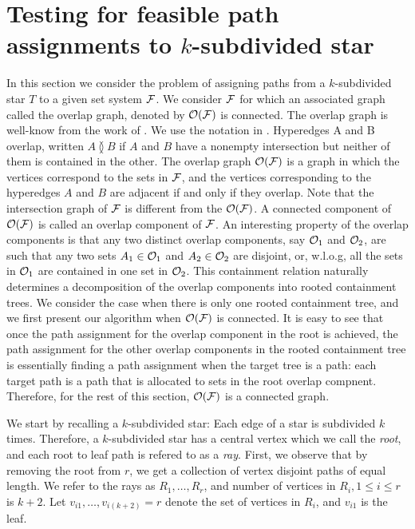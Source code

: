 \documentclass[11pt,letter]{../lib/llncs}
\def\cF{{\cal F}}
\def\cO{{\cal O}}
\def\overlap{\between}
\begin{document}
\section{Testing for feasible path assignments to $k$-subdivided star}
\label{sec:ksubdivstar}
In this section we consider the problem of assigning paths from a $k$-subdivided 
star $T$ to a given set system $\cF$.  We consider $\cF$ for which an associated graph
called the overlap graph, denoted by $\cO(\cF)$ is connected.  The overlap graph is well-know from the work of \cite{kklv10,nsnrs09,wlh02}.   We use the notation in \cite{kklv10}.  Hyperedges A and B overlap, written $A \overlap B$  if $A$ and
$B$ have a nonempty intersection but neither of them is contained in  the other. The
overlap graph $\cO(\cF)$ is a graph in which the vertices correspond to the sets in $\cF$,
and the
vertices corresponding to the hyperedges $A$ and $B$ are adjacent if and only if
they overlap.  Note that the intersection graph of $\cF$ is different from the $\cO(\cF)$.
 A connected component of $\cO(\cF)$ is called an overlap component of $\cF$.  
An interesting property of the overlap components is that any two distinct overlap 
components, say $\cO_1$ and $\cO_2$, are such that any two sets $A_1 \in \cO_1$ and $A_2 \in \cO_2$ are disjoint, or, w.l.o.g, all the sets in $\cO_1$ are contained in one set in $\cO_2$.  
 This containment relation naturally determines a decomposition of the overlap 
components into rooted containment trees.   We consider the case when there is only one rooted containment tree, and we first present our algorithm when $\cO(\cF)$ is
connected.  It is easy to see that once the path assignment for the overlap component in the root is achieved, the path assignment for the other overlap components in the rooted containment tree is
essentially finding a path assignment when the target tree is a path: each target path is a path that is allocated to sets in the root overlap compnent.  Therefore, for the
rest of this section, $\cO(\cF)$ is a connected graph.  

We start by recalling a $k$-subdivided star: Each edge of a star is subdivided $k$ times.
Therefore, a $k$-subdivided star has a central vertex which we call the {\em root}, and each root to leaf path is refered to as a {\em ray}.  First, we observe that by removing the
root from $r$, we get a collection of vertex disjoint paths of equal length.  
We refer to the rays as $R_1, \ldots, R_r$, and number of vertices in $R_i, 1 \leq i \leq r$ is $k+2$.  Let $v_{i1},\ldots,v_{i(k+2)}=r$ denote the set of vertices in $R_i$, and $v_{i1}$ is the leaf. 
  
\end{document}
